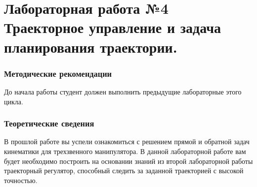 \documentclass[12pt,a4paper,openany]{extarticle}
\begin{document}
\part*{Лабораторная работа №4\\ Траекторное управление и задача планирования траектории.}
\section{Методические рекомендации}
\hspace*{\parindent}До начала работы студент должен выполнить предыдущие лабораторные этого цикла.

\section{Теоретические сведения}
\hspace*{\parindent}В прошлой работе вы успели ознакомиться с решением прямой и обратной задач кинематики для трехзвенного манипулятора. В данной лабораторной работе вам будет необходимо построить на основании знаний из второй лабораторной работы траекторный регулятор, способный следить за заданной траекторией с высокой точностью.




\end{document}
